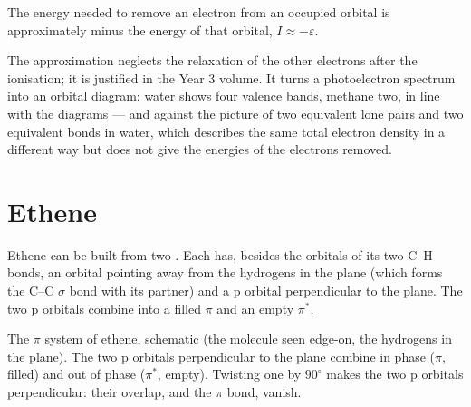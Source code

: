 \begin{proposition}\label{prop:b2:fragment-orbitals:koopmans}
The energy needed to remove an electron from an occupied orbital is
approximately minus the energy of that orbital, $I \approx -\varepsilon$.
\end{proposition}

\admitted

The approximation neglects the relaxation of the other electrons after the
ionisation; it is justified in the Year 3 volume. It turns a photoelectron
spectrum into an orbital diagram: water shows four valence bands, methane two,
in line with the  diagrams --- and against the picture of two equivalent
lone pairs and two equivalent bonds in water, which describes the same total
electron density in a different way but does not give the energies of the
electrons removed.

\section{Ethene}

Ethene can be built from two  . Each  has, besides the
orbitals of its two C--H bonds, an orbital pointing away from the hydrogens in the
plane (which forms the C--C $\sigma$ bond with its partner) and a p orbital
perpendicular to the plane. The two p orbitals combine into a filled $\pi$ and an
empty $\pi^*$.

\begin{omfigure}

{\small The $\pi$ system of ethene, schematic (the molecule seen edge-on, the
hydrogens in the plane). The two p orbitals perpendicular to the plane combine
in phase ($\pi$, filled) and out of phase ($\pi^*$, empty). Twisting one 
by $90^\circ$ makes the two p orbitals perpendicular: their overlap, and the $\pi$
bond, vanish.}
\end{omfigure}


